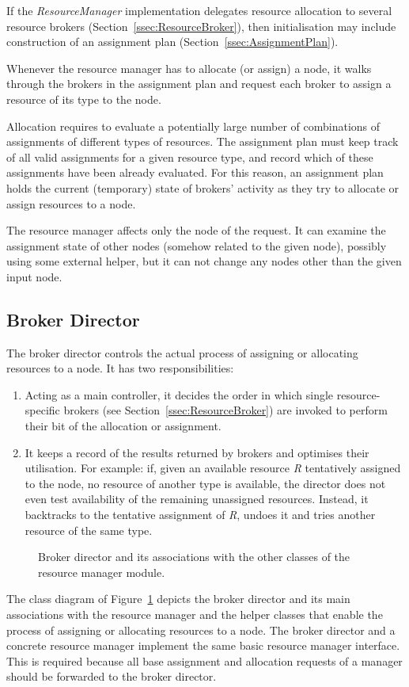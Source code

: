\documentclass[a4paper,twoside]{tce}
\begin{document}
If the \emph{ResourceManager} implementation delegates resource allocation
to several resource brokers (Section~\ref{ssec:ResourceBroker}), then
initialisation may include construction of an assignment plan
(Section~\ref{ssec:AssignmentPlan}).

Whenever the resource manager has to allocate (or assign) a node, it walks
through the brokers in the assignment plan and request each broker to assign
a resource of its type to the node.

Allocation requires to evaluate a potentially large number of combinations
of assignments of different types of resources.
%
The assignment plan must keep track of all valid assignments for a given
resource type, and record which of these assignments have been already
evaluated.
%
For this reason, an assignment plan holds the current (temporary) state of
brokers' activity as they try to allocate or assign resources to a node.

The resource manager affects only the node of the request. It can examine
the assignment state of other nodes (somehow related to the given node),
possibly using some external helper, but it can not change any nodes other
than the given input node.

\subsection{Broker Director}
\label{ssec:BrokerDirector}

The broker director controls the actual process of assigning or allocating
resources to a node. It has two responsibilities:
\begin{enumerate}
\item%
  Acting as a main controller, it decides the order in which single
  resource-specific brokers (see Section~\ref{ssec:ResourceBroker}) are
  invoked to perform their bit of the allocation or assignment.
\item%
  It keeps a record of the results returned by brokers and optimises their
  utilisation. For example: if, given an available resource \emph{R}
  tentatively assigned to the node, no resource of another type is
  available, the director does not even test availability of the remaining
  unassigned resources. Instead, it backtracks to the tentative assignment
  of \emph{R}, undoes it and tries another resource of the same type.
\end{enumerate}

\begin{figure}[tb]
\centerline{}
\caption{Broker director and its associations with the other classes of the
  resource manager module.}
  \label{fig:broker-director}
\end{figure}
%
The class diagram of Figure~\ref{fig:broker-director} depicts the broker
director and its main associations with the resource manager and the helper
classes that enable the process of assigning or allocating resources to a
node. The broker director and a concrete resource manager implement the same
basic resource manager interface. This is required because all base
assignment and allocation requests of a manager should be forwarded to the
broker director.
\end{document}
